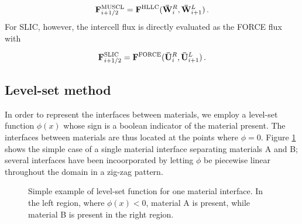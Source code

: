 \documentclass[final,3p,twocolumn,times]{elsarticle}
\begin{document}
\begin{equation}
    \label{eq:MUSCL}
    {\bf F}_{i+1/2}^{\rm MUSCL} = {\bf F}^{\rm HLLC}({\bf
    \bar{W}}_i^R, {\bf \bar{W}}_{i+1}^L) \,.
\end{equation}
%
For SLIC, however, the intercell flux is directly evaluated as the FORCE flux with 

\begin{equation}
    \label{eq:SLIC}
    {\bf F}_{i+1/2}^{\rm SLIC} = {\bf F}^{\rm FORCE}({\bf
    \bar{U}}_i^R, {\bf \bar{U}}_{i+1}^L) \,.
\end{equation}
\subsection{Level-set method}
\label{subsec:levelset}

In order to represent the interfaces between materials, we employ a level-set
function $\phi(x)$ whose sign is a boolean indicator of the material present. The
interfaces between materials are thus located at the points where $\phi=0$.
Figure \ref{fig:levelSet} shows the simple case of a single material interface
separating materials A and B; several interfaces have been incoorporated by
letting $\phi$ be piecewise linear throughout the domain in a zig-zag
pattern. 

\begin{figure}[htb]
    \centering
    \caption{Simple example of level-set function for one material interface.
    In the left region, where $\phi(x)<0$, material A is present,
    while material B is present in the right region. }
    \label{fig:levelSet}
\end{figure}
\end{document}
